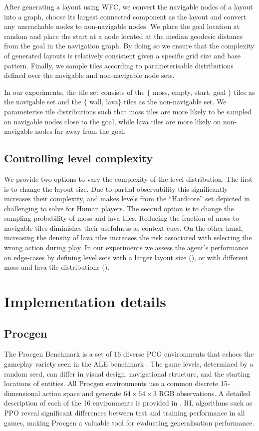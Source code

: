 After generating a layout using WFC, we convert the navigable nodes of a layout into a graph, choose its largest connected component as the layout and convert any unreachable nodes to non-navigable nodes. We place the goal location at random and place the start at a node located at the median geodesic distance from the goal in the navigation graph. By doing so we ensure that the complexity of generated layouts is relatively consistent given a specific grid size and base pattern. Finally, we sample tiles according to parameterisable distributions defined over the navigable and non-navigable node sets. 

In our experiments, the tile set consists of the $\{$ moss, empty, start, goal $\}$ tiles as the navigable set and the $\{$ wall, lava$\}$ tiles as the non-navigable set. We parameterise tile distributions such that moss tiles are more likely to be sampled on navigable nodes close to the goal, while lava tiles are more likely on non-navigable nodes far away from the goal.

\subsection{Controlling level complexity}

We provide two options to vary the complexity of the level distribution. The first is to change the layout size. Due to partial observability this significantly increases their complexity, and makes levels from the ``Hardcore'' set depicted in  challenging to solve for Human players. The second option is to change the sampling probability of moss and lava tiles. Reducing the fraction of moss to navigable tiles diminishes their usefulness as context cues. On the other hand, increasing the density of lava tiles increases the risk associated with selecting the wrong action during play. In our experiments we assess the agent's performance on edge-cases by defining level sets with a larger layout size (), or with different moss and lava tile distributions ().  

\section{Implementation details}\label{c3:app:imp_details}

\subsection{Procgen}\label{c3:app:procgen}
The Procgen Benchmark is a set of 16 diverse PCG environments that echoes the gameplay variety seen in the ALE benchmark \citep{ALE}. The game levels, determined by a random seed, can differ in visual design, navigational structure, and the starting locations of entities. All Procgen environments use a common discrete 15-dimensional action space and generate $64 \times 64 \times 3$ RGB observations. A detailed description of each of the 16 environments is provided in \citet{procgen}. RL algorithms such as PPO reveal significant differences between test and training performance in all games, making Procgen a valuable tool for evaluating generalisation performance.

